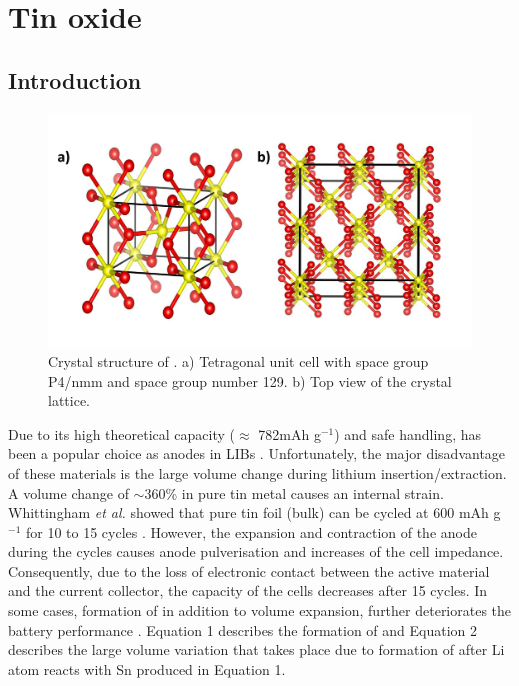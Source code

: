 \section{Tin oxide}

\subsection{Introduction}

\begin{figure}[th!]
  \centering
  \includegraphics[width=\textwidth]{Figures/chap6fig/SnO2crys}
    \caption{Crystal structure of . a) Tetragonal unit cell with space group P4/nmm and space group number 129. b) Top view of the crystal lattice.}
  \label{Figures/chap6fig:SnO2crys}
  \end{figure}
  
Due to its high theoretical capacity ($\approx$ 782mAh g$^{-1}$) and safe handling,  has been a popular choice as anodes in LIBs  \cite{idota_tin-based_1997}. Unfortunately, the major disadvantage of these materials is the large volume change during lithium insertion/extraction. A volume change of $\sim$360\% in pure tin metal causes an internal strain. Whittingham \textit{et al.} showed that pure tin foil (bulk) can be cycled at 600 mAh g$^{-1}$ for 10 to 15 cycles \cite{yang_anodes_2003}. However, the expansion and contraction of the anode during the cycles causes anode pulverisation and increases of the cell impedance. Consequently, due to the loss of electronic contact between the active material and the current collector, the capacity of the cells decreases after 15 cycles. In some cases, formation of  in addition to volume expansion, further deteriorates the battery performance \cite{zhao_tin-based_2016}. Equation 1 describes the formation of  and Equation 2 describes the large volume variation that takes place due to formation of  after Li atom reacts with Sn produced in Equation 1\cite{park_effect_2008}.

